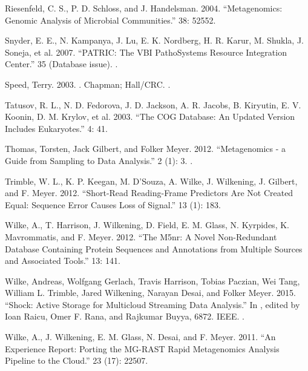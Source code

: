 \documentclass[letterpaper,10pt,english]{sphinxmanual}
\begin{document}
Riesenfeld, C. S., P. D. Schloss, and J. Handelsman. 2004.
“Metagenomics: Genomic Analysis of Microbial Communities.”  38: 525\textendash{}52.

Snyder, E. E., N. Kampanya, J. Lu, E. K. Nordberg, H. R. Karur, M.
Shukla, J. Soneja, et al. 2007. “PATRIC: The VBI PathoSystems
Resource Integration Center.”  35 (Database
issue). .

Speed, Terry. 2003. . Chapman; Hall/CRC.
.

Tatusov, R. L., N. D. Fedorova, J. D. Jackson, A. R. Jacobs, B.
Kiryutin, E. V. Koonin, D. M. Krylov, et al. 2003. “The COG
Database: An Updated Version Includes Eukaryotes.”  4: 41.

Thomas, Torsten, Jack Gilbert, and Folker Meyer. 2012.
“Metagenomics - a Guide from Sampling to Data Analysis.”
 2 (1): 3.
.

Trimble, W. L., K. P. Keegan, M. D’Souza, A. Wilke, J. Wilkening,
J. Gilbert, and F. Meyer. 2012. “Short-Read Reading-Frame
Predictors Are Not Created Equal: Sequence Error Causes Loss of
Signal.”  13 (1): 183.

Wilke, A., T. Harrison, J. Wilkening, D. Field, E. M. Glass, N.
Kyrpides, K. Mavrommatis, and F. Meyer. 2012. “The M5nr: A Novel
Non-Redundant Database Containing Protein Sequences and
Annotations from Multiple Sources and Associated Tools.”  13: 141.

Wilke, Andreas, Wolfgang Gerlach, Travis Harrison, Tobias Paczian,
Wei Tang, William L. Trimble, Jared Wilkening, Narayan Desai, and
Folker Meyer. 2015. “Shock: Active Storage for Multicloud
Streaming Data Analysis.” In , edited by Ioan Raicu, Omer F. Rana, and Rajkumar Buyya,
68\textendash{}72. IEEE. .

Wilke, A., J. Wilkening, E. M. Glass, N. Desai, and F. Meyer.
2011. “An Experience Report: Porting the MG-RAST Rapid
Metagenomics Analysis Pipeline to the Cloud.”  23 (17): 2250\textendash{}7.
\end{document}
